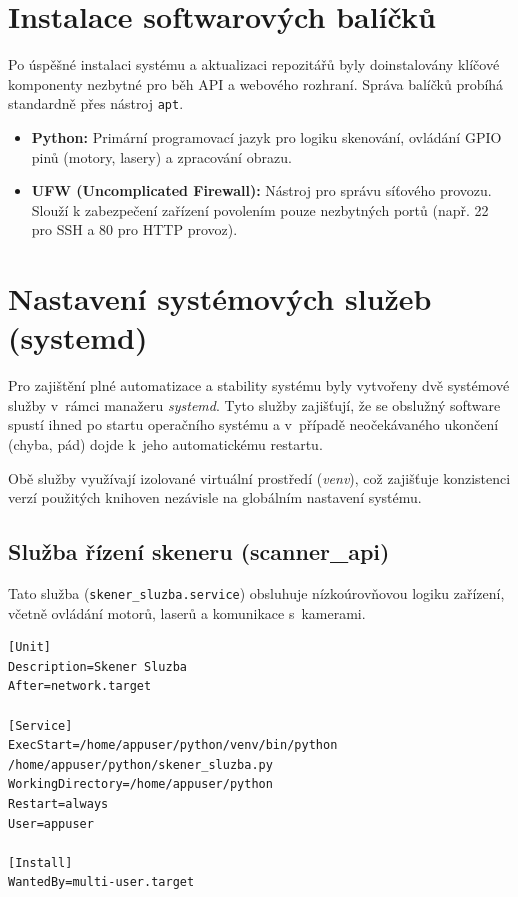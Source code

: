 \documentclass[12pt,a4paper]{report}
\begin{document}
\section{Instalace softwarových balíčků}
Po úspěšné instalaci systému a aktualizaci repozitářů byly doinstalovány klíčové \mbox{komponenty} nezbytné pro běh API a webového rozhraní. Správa balíčků probíhá standardně přes nástroj \texttt{apt}.

\begin{itemize}
    \item \textbf{Python:} Primární programovací jazyk pro logiku skenování, ovládání GPIO pinů (motory, lasery) a zpracování obrazu.
    \item \textbf{UFW (Uncomplicated Firewall):} Nástroj pro správu síťového provozu. Slouží k zabezpečení zařízení povolením pouze nezbytných portů (např. 22 pro SSH a 80 pro HTTP provoz).
\end{itemize}
\section{Nastavení systémových služeb (systemd)}
Pro zajištění plné automatizace a stability systému byly vytvořeny dvě systémové služby v~rámci manažeru \textit{systemd}. Tyto služby zajišťují, že se obslužný software spustí ihned po startu operačního systému a v~případě neočekávaného ukončení (chyba, pád) dojde k~jeho automatickému restartu.

Obě služby využívají izolované virtuální prostředí (\textit{venv}), což zajišťuje konzistenci verzí použitých knihoven nezávisle na globálním nastavení systému.

\subsection{Služba řízení skeneru (scanner\_api)}
Tato služba (\texttt{skener\_sluzba.service}) obsluhuje nízkoúrovňovou logiku zařízení, včetně ovládání motorů, laserů a komunikace s~kamerami. 

\begin{lstlisting}[caption=Konfigurace služby pro řízení skeneru]
[Unit]
Description=Skener Sluzba
After=network.target

[Service]
ExecStart=/home/appuser/python/venv/bin/python /home/appuser/python/skener_sluzba.py
WorkingDirectory=/home/appuser/python
Restart=always
User=appuser

[Install]
WantedBy=multi-user.target
\end{lstlisting}
\end{document}
